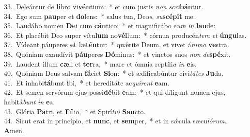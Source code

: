 {33.~}Deleántur de \textbf{li}bro vi\textbf{vén}tium:~* et cum justis \textit{non} \textit{scri}\textbf{bán}tur.\\
{34.~}Ego sum \textbf{pau}per et \textbf{do}lens:~* salus tua, De\textit{us}, \textit{su}\textbf{scé}\textbf{pit} me.\\
{35.~}Laudábo nomen \textbf{De}i cum \textbf{cán}tico:~* et magnificábo e\textit{um} \textit{in} \textbf{lau}de:\\
{36.~}Et placébit Deo super vítu\textbf{lum} no\textbf{vél}lum:~* córnua producén\textit{tem} \textit{et} \textbf{ún}\textbf{gu}las.\\
{37.~}Vídeant páuperes \textbf{et} læ\textbf{tén}tur:~* quǽrite Deum, et vivet á\textit{ni}\textit{ma} \textbf{ve}stra.\\
{38.~}Quóniam exaudívit \textbf{páu}peres \textbf{Dó}minus:~* et vinctos suos \textit{non} \textit{de}\textbf{spé}xit.\\
{39.~}Laudent illum \textbf{cæ}li et \textbf{ter}ra,~* mare et ómnia reptíli\textit{a} \textit{in} \textbf{e}is.\\
{40.~}Quóniam Deus salvam \textbf{fá}ciet \textbf{Si}on:~* et ædificabúntur civi\textit{tá}\textit{tes} \textbf{Ju}da.\\
{41.~}Et inhabi\textbf{tá}bunt \textbf{i}bi,~* et hereditáte ac\textit{quí}\textit{rent} \textbf{e}am.\\
{42.~}Et semen servórum ejus possi\textbf{dé}bit \textbf{e}am:~* et qui díligunt nomen ejus, habitá\textit{bunt} \textit{in} \textbf{e}a.\\
{43.~}Glória \textbf{Pa}tri, et \textbf{Fí}lio,~* et Spirí\textit{tu}\textit{i} \textbf{San}cto.\\
{44.~}Sicut erat in princípio, et \textbf{nunc}, et \textbf{sem}per,~* et in sǽcula sæcu\textit{ló}\textit{rum}. \textbf{A}men.\\
